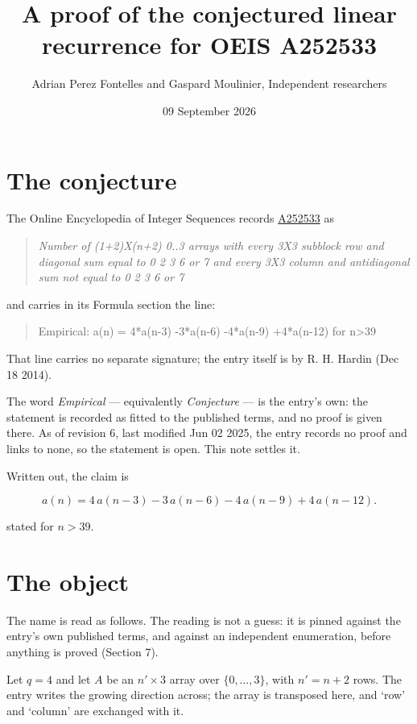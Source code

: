 \documentclass[11pt]{article}
\title{A proof of the conjectured linear recurrence for OEIS A252533}
\author{Adrian Perez Fontelles and Gaspard Moulinier, Independent researchers}
\date{09 September 2026}
\theoremstyle{definition}
\begin{document}
\maketitle
\section{The conjecture}

The Online Encyclopedia of Integer Sequences records \href{https://oeis.org/A252533}{A252533} as

\begin{quote}\itshape Number of (1+2)X(n+2) 0..3 arrays with every 3X3 subblock row and diagonal sum equal to 0 2 3 6 or 7 and every 3X3 column and antidiagonal sum not equal to 0 2 3 6 or 7\end{quote}

and carries in its Formula section the line:

\begin{quote}\ttfamily Empirical: a(n) = 4*a(n-3) -3*a(n-6) -4*a(n-9) +4*a(n-12) for n>39\end{quote}

That line carries no separate signature; the entry itself is by R. H. Hardin (Dec 18 2014).

The word {\itshape Empirical} --- equivalently {\itshape Conjecture} --- is the entry's own: the statement is recorded as fitted to the published terms, and no proof is given there. As of revision 6, last modified Jun 02 2025, the entry records no proof and links to none, so the statement is open. This note settles it.

Written out, the claim is

\[a(n) = 4\,a(n-3) - 3\,a(n-6) - 4\,a(n-9) + 4\,a(n-12).\]

stated for $n > 39$.

\section{The object}

The name is read as follows. The reading is not a guess: it is pinned against the entry's own published terms, and against an independent enumeration, before anything is proved (Section 7).

Let $q = 4$ and let $A$ be an $n' \times 3$ array over $\{0,\dots,3\}$, with $n' = n + 2$ rows. The entry writes the growing direction across; the array is transposed here, and `row' and `column' are exchanged with it.
\end{document}
